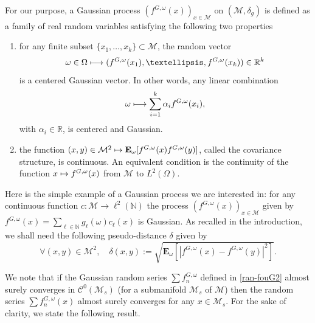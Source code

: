 \documentclass[11pt]{article}
\def\mto{\mathchoice{\longmapsto}{\mapsto}{\mapsto}{\mapsto}}
\newenvironment{enumeratei}
{\bgroup\def\theenumi{\roman{enumi}}\def\theenumii{\arabic{enumii}}\begin{enumerate}}
{\end{enumerate}\egroup}
\theoremstyle{theorem}
\theoremstyle{definition}
\newcommand\R{\mathbb{R}}
\newcommand\E{\mathbf{E}}
\newcommand\N{\mathbb{N}}
\newcommand\CC{\mathcal{C}}
\begin{document}
For our purpose, a Gaussian process $(f^{G,\omega}(x))_{x\in \mathcal{M}}$ on $(\mathcal{M},\delta_g)$ is defined as a family of real random variables satisfying the following two properties
\begin{enumeratei}
\item for any finite subset $\{x_1,\dots,x_k\}\subset \mathcal{M}$, the random vector
\begin{equation*}\omega\in\Omega\mto (f^{G,\omega}(x_1),\dots,f^{G,\omega}(x_k))\in \R^k \end{equation*}
is a centered Gaussian vector. In other words, any linear combination
\[
\omega\mto \sum_{i=1}^k\alpha_i f^{G,\omega}(x_i),
\]
with $\alpha_i\in \R$, is centered and Gaussian.
\item the function $(x,y)\in \mathcal{M}^2\mto \E_{\omega}[f^{G,\omega}(x)f^{G,\omega}(y)]$, called the covariance structure, is continuous. An equivalent condition is the continuity of the function $x\mto f^{G,\omega}(x)$ from $\mathcal{M}$ to $L^2(\Omega)$.
\end{enumeratei}

Here is the simple example of a Gaussian process we are interested in: for any
continuous function $c:\mathcal{M}\to \ell^2(\N)$ the process $(f^{G,\omega}(x))_{x\in \mathcal{M}}$ given by $f^{G,\omega}(x)=\sum_{\ell\in \N} g_\ell(\omega) c_\ell(x)$ is Gaussian.
As recalled in the introduction, we shall need the following pseudo-distance $\delta$ given by
\begin{equation*}
\forall (x,y)\in \mathcal{M}^2, \quad \delta(x,y):=\sqrt{\E_{\omega}[|f^{G,\omega}(x)-f^{G,\omega}(y)|^2]}.
\end{equation*}

We note that if the Gaussian random series $\sum f_n^{G,\omega}$ defined in \eqref{ran-fouG2} almost surely converges in $\CC^0(\mathcal{M}_s)$ (for a submanifold $\mathcal{M}_s$ of $\mathcal{M}$) then the random series $\sum f_n^{G,\omega}(x)$ almost surely converges for any $x\in \mathcal{M}_s$.
For the sake of clarity, we state the following result.
\end{document}
